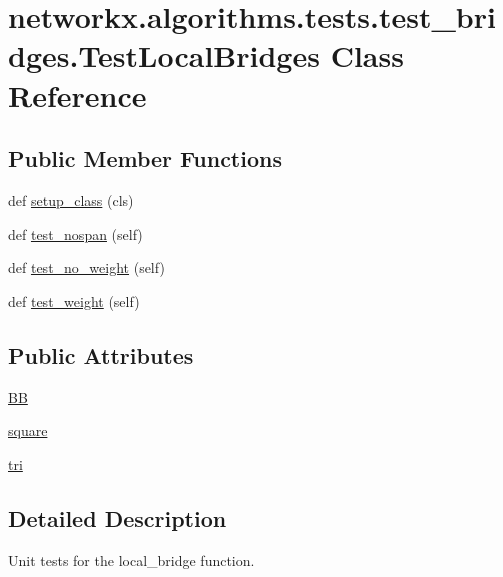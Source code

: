 \hypertarget{classnetworkx_1_1algorithms_1_1tests_1_1test__bridges_1_1TestLocalBridges}{}\section{networkx.\+algorithms.\+tests.\+test\+\_\+bridges.\+Test\+Local\+Bridges Class Reference}
\label{classnetworkx_1_1algorithms_1_1tests_1_1test__bridges_1_1TestLocalBridges}
\subsection*{Public Member Functions}
\begin{DoxyCompactItemize}
\item 
def \hyperlink{classnetworkx_1_1algorithms_1_1tests_1_1test__bridges_1_1TestLocalBridges_a33a0d39606d77b36a0b30e8ccc8b6957}{setup\+\_\+class} (cls)
\item 
def \hyperlink{classnetworkx_1_1algorithms_1_1tests_1_1test__bridges_1_1TestLocalBridges_aa291261cac61cfb189f67e19f334a6fb}{test\+\_\+nospan} (self)
\item 
def \hyperlink{classnetworkx_1_1algorithms_1_1tests_1_1test__bridges_1_1TestLocalBridges_aa9803266845bf70cc471e021c46b2612}{test\+\_\+no\+\_\+weight} (self)
\item 
def \hyperlink{classnetworkx_1_1algorithms_1_1tests_1_1test__bridges_1_1TestLocalBridges_a8eaaface5e8543a0760c9bec25f6096b}{test\+\_\+weight} (self)
\end{DoxyCompactItemize}
\subsection*{Public Attributes}
\begin{DoxyCompactItemize}
\item 
\hyperlink{classnetworkx_1_1algorithms_1_1tests_1_1test__bridges_1_1TestLocalBridges_a33b1881f6cb37bb71041d39241c191d2}{BB}
\item 
\hyperlink{classnetworkx_1_1algorithms_1_1tests_1_1test__bridges_1_1TestLocalBridges_a96b32f410eef36306cc2ccfb33d54d88}{square}
\item 
\hyperlink{classnetworkx_1_1algorithms_1_1tests_1_1test__bridges_1_1TestLocalBridges_abe3c9c7dcd709f95bde2658b89afa449}{tri}
\end{DoxyCompactItemize}


\subsection{Detailed Description}
\begin{DoxyVerb}Unit tests for the local_bridge function.\end{DoxyVerb}
 

